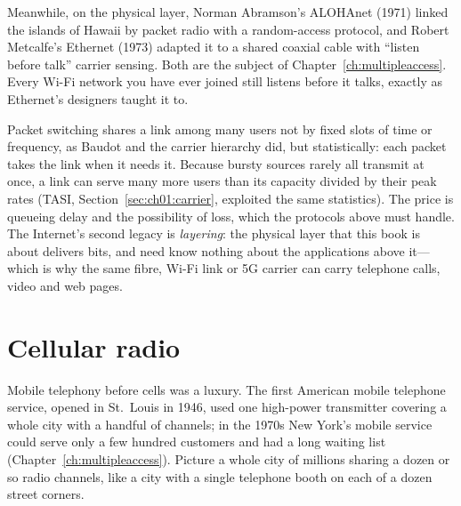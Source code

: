 Meanwhile, on the physical layer, Norman Abramson's ALOHAnet (1971) linked the islands of Hawaii by
packet radio with a random-access protocol, and Robert Metcalfe's Ethernet (1973) adapted it to a
shared coaxial cable with ``listen before talk'' carrier sensing. Both are the subject of
Chapter~\ref{ch:multipleaccess}. Every Wi-Fi network you have ever joined still listens before it
talks, exactly as Ethernet's designers taught it to.


\begin{keyidea}
Packet switching shares a link among many users not by fixed slots of time or frequency, as Baudot and
the carrier hierarchy did, but statistically: each packet takes the link
when it needs it. Because bursty sources rarely all transmit at once, a link can serve many more users
than its capacity divided by their peak rates (TASI, Section~\ref{sec:ch01:carrier}, exploited the same
statistics). The price is queueing delay and the possibility of loss, which the protocols above must
handle. The Internet's second legacy is \emph{layering}: the physical layer that this book is about
delivers bits, and need know nothing about the applications above it---which is why the same fibre,
Wi-Fi link or 5G carrier can carry telephone calls, video and web pages.
\end{keyidea}

\chOneNeed
\section{Cellular radio}
\label{sec:ch01:cellular}

Mobile telephony before cells was a luxury. The first American mobile telephone service, opened in
St.~Louis in 1946, used one high-power transmitter covering a whole city with a handful of channels;
in the 1970s New York's mobile service could serve only a few hundred customers and had a long waiting
list (Chapter~\ref{ch:multipleaccess}). Picture a whole city of millions sharing a dozen or so radio
channels, like a city with a single telephone booth on each of a dozen street corners.


